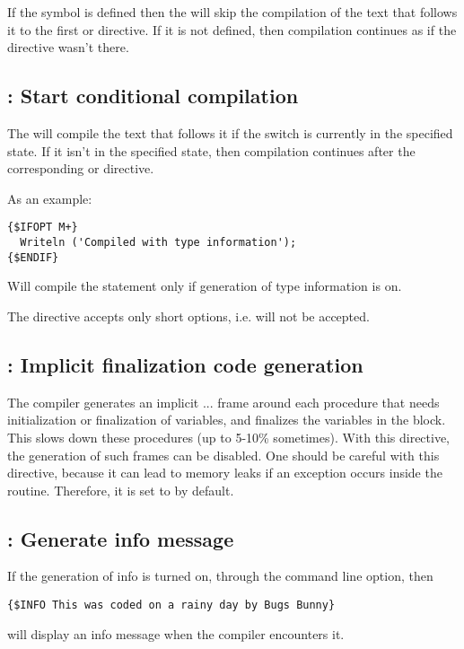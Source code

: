 If the symbol  is defined then the 
will skip the compilation of the text that follows it to the first
 or  directive.
If it is not defined, then compilation continues as if the directive
wasn't there.

\subsection{ : Start conditional compilation}

The  will compile the text that follows it if the
switch  is currently in the specified state.
If it isn't in the specified state, then compilation continues after the
corresponding  or  directive.

As an example:
\begin{verbatim}
{$IFOPT M+}
  Writeln ('Compiled with type information');
{$ENDIF}
\end{verbatim}
Will compile the  statement only if generation of type information is on.

\begin{remark}The  directive accepts only short options,
i.e.  will not be accepted.
\end{remark}

\subsection{ : Implicit finalization code
generation}

The compiler generates an implicit ... frame around
each procedure that needs initialization or finalization of variables, and
finalizes the variables in the  block. This
slows down these procedures (up to 5-10\% sometimes). 
With this directive, the generation of such frames can be disabled. 
One should be careful with this directive, because it can lead to memory 
leaks if an exception occurs inside the routine. 
Therefore, it is set to  by default.

\subsection{ : Generate info message}

If the generation of info is turned on, through the  command line
option, then
\begin{verbatim}
{$INFO This was coded on a rainy day by Bugs Bunny}
\end{verbatim}
will display an info message when the compiler encounters it.

